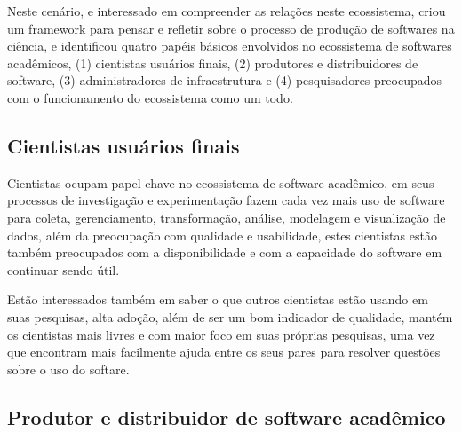 

Neste cenário, e interessado em compreender as relações neste ecossistema,
 criou um framework para pensar e refletir
sobre o processo de produção de softwares na ciência, e identificou quatro
papéis básicos envolvidos no ecossistema de softwares acadêmicos, (1) cientistas
usuários finais, (2) produtores e distribuidores de software, (3)
administradores de infraestrutura e (4) pesquisadores preocupados com o
funcionamento do ecossistema como um todo.

\subsection{Cientistas usuários finais}

Cientistas ocupam papel chave no ecossistema de software acadêmico, em seus
processos de investigação e experimentação fazem cada vez mais uso
de software para coleta, gerenciamento, transformação, análise, modelagem e
visualização de dados, além da preocupação com qualidade e usabilidade,
estes cientistas estão também preocupados com a disponibilidade e com a
capacidade do software em continuar sendo útil.

Estão interessados também em saber o que outros cientistas estão usando em suas
pesquisas, alta adoção, além de ser um bom indicador de qualidade, mantém os
cientistas mais livres e com maior foco em suas próprias pesquisas, uma vez que
encontram mais facilmente ajuda entre os seus pares para resolver questões
sobre o uso do softare.



\subsection{Produtor e distribuidor de software acadêmico}

